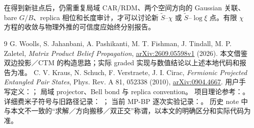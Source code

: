 \documentclass[11pt]{article}
\newcommand{\tS}{\widetilde S}
\begin{document}
在得到新驻点后，仍需重复局域 CAR/RDM、两个空间方向的 Gaussian 关联、
bare $G/B$、replica 相位和长度审计，才可以讨论新 $\tS$--$\chi$ 或
$\tS$--$\log\xi$ 点。有限 $\chi$ 方程的收敛与物理外推的可信度应始终分别报告。

\begin{thebibliography}{9}
G. Woolls, S. Jahanbani, A. Pashikanti, M. T. Fishman, J. Tindall, M. P. Zaletel,
\emph{Matrix Product Belief Propagation},
\href{https://arxiv.org/abs/2609.05598v1}{arXiv:2609.05598v1} (2026).
本文借鉴双边投影／CTM 的构造思路；实际 graded 实现与数值结论以上述本地代码和报告为准。
C. V. Kraus, N. Schuch, F. Verstraete, J. I. Cirac,
\emph{Fermionic Projected Entangled Pair States}, Phys. Rev. A 81, 052338 (2010),
\href{https://arxiv.org/abs/0904.4667}{arXiv:0904.4667}.
用户手写定义：\href{../../fPEPS_renyi_2.pdf}{}；
局域 projector、Bell bond 与 replica convention。
项目理论参考：\href{../../refs/multientropy_PEPS.pdf}{}。
详细费米子符号与旧路径记录：
\href{../fpeps_signs_zh/main.pdf}{}；
当前 MP-BP 逐次实验记录：。
历史 note 中与本文不一致的“求解／方向搬移／双正交”称谓，以本文的明确区分和实际代码为准。
\end{thebibliography}
\end{document}
